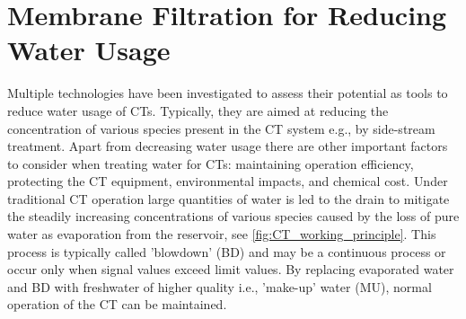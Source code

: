 \section{Membrane Filtration for Reducing Water Usage}



Multiple technologies have been investigated to assess their potential as tools to reduce water usage of CTs.
Typically, they are aimed at reducing the concentration of various species present in the CT system e.g., by side-stream treatment. %
Apart from decreasing water usage there are other important factors to consider when treating water for CTs: maintaining operation efficiency, protecting the CT equipment, environmental impacts, and chemical cost. \citep{IntroductionCoolingTower2014}
Under traditional CT operation large quantities of water is led to the drain to mitigate the steadily increasing concentrations of various species caused by the loss of pure water as evaporation from the reservoir, see \cref{fig:CT_working_principle}.
This process is typically called 'blowdown' (BD) and may be a continuous process or occur only when signal values exceed limit values. \citep{PracticalApproachWater2007}
By replacing evaporated water and BD with freshwater of higher quality i.e., 'make-up' water (MU), normal operation of the CT can be maintained.
\citep{IntroductionCoolingTower2014}

